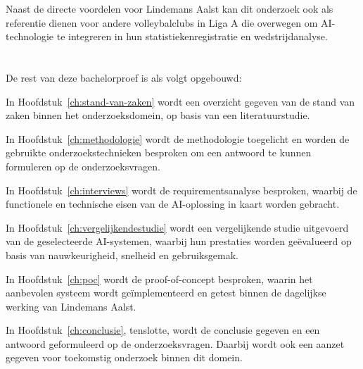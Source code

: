 Naast de directe voordelen voor Lindemans Aalst kan dit onderzoek ook als referentie dienen voor andere volleybalclubs in Liga A die overwegen om AI-technologie te integreren in hun statistiekenregistratie en wedstrijdanalyse.

\section{}%
\label{sec:opzet-bachelorproef}


De rest van deze bachelorproef is als volgt opgebouwd:

In Hoofdstuk~\ref{ch:stand-van-zaken} wordt een overzicht gegeven van de stand van zaken binnen het onderzoeksdomein, op basis van een literatuurstudie.

In Hoofdstuk~\ref{ch:methodologie} wordt de methodologie toegelicht en worden de gebruikte onderzoekstechnieken besproken om een antwoord te kunnen formuleren op de onderzoeksvragen.

In Hoofdstuk~\ref{ch:interviews} wordt de requirementsanalyse besproken, waarbij de functionele en technische eisen van de AI-oplossing in kaart worden gebracht.

In Hoofdstuk~\ref{ch:vergelijkendestudie} wordt een vergelijkende studie uitgevoerd van de geselecteerde AI-systemen, waarbij hun prestaties worden geëvalueerd op basis van nauwkeurigheid, snelheid en gebruiksgemak.	

In Hoofdstuk~\ref{ch:poc} wordt de proof-of-concept besproken, waarin het aanbevolen systeem wordt geïmplementeerd en getest binnen de dagelijkse werking van Lindemans Aalst.

In Hoofdstuk~\ref{ch:conclusie}, tenslotte, wordt de conclusie gegeven en een antwoord geformuleerd op de onderzoeksvragen. Daarbij wordt ook een aanzet gegeven voor toekomstig onderzoek binnen dit domein.